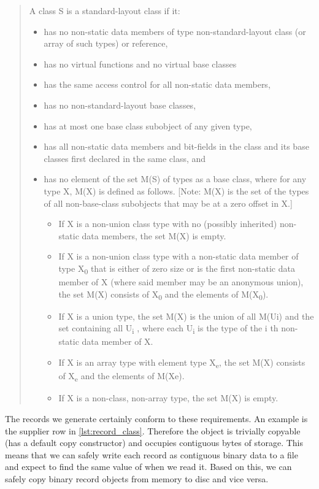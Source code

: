 \begin{quote}
A class S is a standard-layout class if it:
\begin{itemize}
\item has no non-static data members of type non-standard-layout class (or
array of such types) or reference,
\item has no virtual functions and no virtual base classes
\item has the same access control for all non-static data members,
\item has no non-standard-layout base classes,
\item has at most one base class subobject of any given type,
\item has all non-static data members and bit-fields in the class and its
base classes first declared in the same class, and
\item has no element of the set M(S) of types as a base class, where for
any type X, M(X) is defined as follows. [Note: M(X) is the set of
the types of all non-base-class subobjects that may be at a zero
offset in X.]
\begin{itemize}
\item If X is a non-union class type with no (possibly inherited)
non-static data members, the set M(X) is empty.
\item If X is a non-union class type with a non-static data member of
type X\textsubscript{0} that is either of zero size or is the first non-static
data member of X (where said member may be an anonymous union),
the set M(X) consists of X\textsubscript{0} and the elements of M(X\textsubscript{0}).
\item If X is a union type, the set M(X) is the union of all M(Ui) and
the set containing all U\textsubscript{i} , where each U\textsubscript{i} is the type of the i
th non-static data member of X.
\item If X is an array type with element type X\textsubscript{e}, the set M(X) consists
of X\textsubscript{e} and the elements of M(Xe).
\item If X is a non-class, non-array type, the set M(X) is empty.
\end{itemize}
\end{itemize}
\end{quote}

The records we generate certainly conform to these requirements. An
example is the supplier row in \ref{lst:record_class}. Therefore the
object is trivially copyable (has a default copy constructor) and occupies contiguous bytes of
storage. This means that we can safely write each record  as
 contiguous binary data to a file and expect to find the
same value of  when we read it. Based on this, we can safely copy
binary record objects from memory to disc and vice versa.

